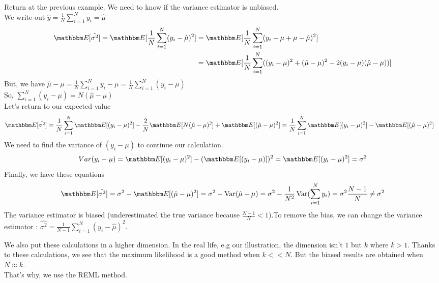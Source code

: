 \documentclass{article}
\begin{document}
\begin{exemple}
Return at the previous example. We need to know if the variance estimator is unbiased.\\
We write out $\hat{y} = \frac{1}{N} \sum_{i=1}^N y_i = \hat{\mu}$
\begin{equation*}
\begin{split}
   \esp[\hat{\sigma^2}] = \esp[\frac{1}{N} \sum_{i=1}^N(y_i-\hat{\mu})^2] 
   &= \esp[\frac{1}{N} \sum_{i=1}^N(y_i-\mu + \mu - \hat{\mu})^2]\\
   &= \esp[\frac{1}{N} \sum_{i=1}^N((y_i-\mu)^2 + (\hat{\mu}-\mu)^2 - 2(y_i-\mu)(\hat{\mu}-\mu))]
   \end{split}
\end{equation*}
But, we have $\hat{\mu}-\mu = \frac{1}{N}\sum_{i=1}^N y_i-\mu = \frac{1}{N}\sum_{i=1}^N(y_i-\mu)$ \\
So, $\sum_{i=1}^N(y_i-\mu) = N(\hat{\mu}-\mu)$\\
Let's return to our expected value
\begin{equation*}
    \begin{split}
        \esp[\hat{\sigma^2}] = \frac{1}{N} \sum_{i=1}^N \esp[(y_i-\mu)^2]-\frac{2}{N}\esp[N(\hat{\mu}-\mu)^2]+\esp[(\hat{\mu}-\mu)^2] 
        &=  \frac{1}{N} \sum_{i=1}^N\esp[(y_i-\mu)^2]-\esp[(\hat{\mu}-\mu)^2]
    \end{split}
\end{equation*}
We need to find the variance of $(y_i-\mu)$ to continue our calculation.
\[\\Var(y_i-\mu) = \esp[(y_i-\mu)^2]-(\esp[(y_i-\mu)])^2 = \esp[(y_i-\mu)^2] = \sigma^2\]
Finally, we have these equations
\begin{equation*}
    \esp[\hat{\sigma^2}] = \sigma^2 - \esp[(\hat{\mu}-\mu)^2] = \sigma^2 - \Var(\hat{\mu}-\mu) = \sigma^2 - \frac{1}{N^2}\Var(\sum_{i=1}^N y_i) = \sigma^2\frac{N-1}{N} \ne \sigma^2
\end{equation*}
The variance estimator is biased (underestimated the true variance because $\frac{N-1}{N}<1$).To remove the bias, we can change the variance estimator : $\hat{\sigma^2} = \frac{1}{N-1}\sum_{i=1}^N (y_i-\hat{\mu})^2$.
\end{exemple}

We also put these calculations in a higher dimension. In the real life, e.g our illustration, the dimension isn't $1$ but $k$ where $k>1$.
Thanks to these calculations, we see that the maximum likelihood is a good method when $k << N$. But the biased results are obtained when $N\approx k$.\\
That's why, we use the REML method.
\end{document}
